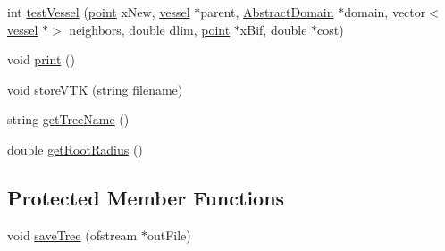 \begin{DoxyCompactItemize}
\item 
int \mbox{\hyperlink{class_fixed_radius_root_variable_viscosity_c_c_o_tree_ac2216604fbfd0a9e532cb01153a36af6}{test\+Vessel}} (\mbox{\hyperlink{structpoint}{point}} x\+New, \mbox{\hyperlink{structvessel}{vessel}} $\ast$parent, \mbox{\hyperlink{class_abstract_domain}{Abstract\+Domain}} $\ast$domain, vector$<$ \mbox{\hyperlink{structvessel}{vessel}} $\ast$$>$ neighbors, double dlim, \mbox{\hyperlink{structpoint}{point}} $\ast$x\+Bif, double $\ast$cost)
\item 
void \mbox{\hyperlink{class_fixed_radius_root_variable_viscosity_c_c_o_tree_ace906f79ed34249637de23e3da9a6d7d}{print}} ()
\item 
void \mbox{\hyperlink{class_fixed_radius_root_variable_viscosity_c_c_o_tree_aec94c48de392230ac558eb8e23647a55}{store\+V\+TK}} (string filename)
\item 
string \mbox{\hyperlink{class_fixed_radius_root_variable_viscosity_c_c_o_tree_a91a2933c13c695bc5ab1f1b3b4b40350}{get\+Tree\+Name}} ()
\item 
double \mbox{\hyperlink{class_fixed_radius_root_variable_viscosity_c_c_o_tree_a2d2312cce810822fe7372157a187cb59}{get\+Root\+Radius}} ()
\end{DoxyCompactItemize}
\subsection*{Protected Member Functions}
\begin{DoxyCompactItemize}
\item 
void \mbox{\hyperlink{class_fixed_radius_root_variable_viscosity_c_c_o_tree_a518c833f789599cf8cfb31d9ceb604df}{save\+Tree}} (ofstream $\ast$out\+File)
\end{DoxyCompactItemize}
